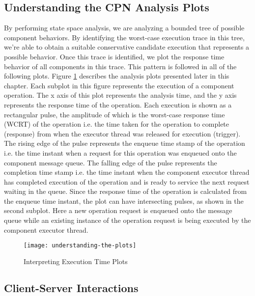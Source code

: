 \subsection{Understanding the CPN Analysis Plots}

By performing state space analysis, we are analyzing a bounded tree of possible component behaviors. By identifying the worst-case execution trace in this tree, we're able to obtain a suitable conservative candidate execution that represents a possible behavior. Once this trace is identified, we plot the response time behavior of all components in this trace. This pattern is followed in all of the following plots. Figure \ref{fig:understanding-the-plots} describes the analysis plots presented later in this chapter. Each subplot in this figure represents the execution of a component operation. The x axis of this plot represents the analysis time, and the y axis represents the response time of the operation. Each execution is shown as a rectangular pulse, the amplitude of which is the worst-case response time (WCRT) of the operation i.e. the time taken for the operation to complete (response) from when the executor thread was released for execution (trigger). The rising edge of the pulse represents the enqueue time stamp of the operation i.e. the time instant when a request for this operation was enqueued onto the component message queue. The falling edge of the pulse represents the completion time stamp i.e. the time instant when the component executor thread has completed execution of the operation and is ready to service the next request waiting in the queue. Since the response time of the operation is calculated from the enqueue time instant, the plot can have intersecting pulses, as shown in the second subplot. Here a new operation request is enqueued onto the message queue while an existing instance of the operation request is being executed by the component executor thread. 

\begin{figure}[h]
	\centering
	\texttt{[image: understanding-the-plots]}
	\caption{Interpreting Execution Time Plots}
	\label{fig:understanding-the-plots}
\end{figure}
\FloatBarrier


\subsection{Client-Server Interactions}

